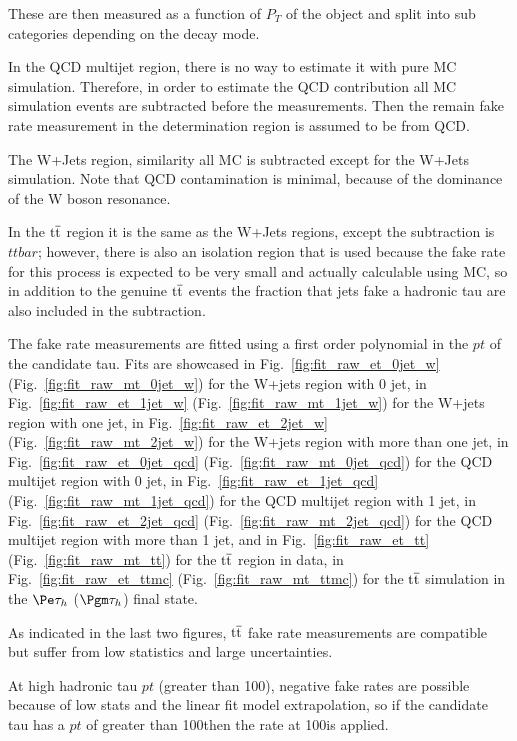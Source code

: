 These are then measured as a function of $P_T$ of the object and split into sub categories depending on the decay mode.  

In the QCD multijet region, there is no way to estimate it with pure MC simulation. Therefore, in order to estimate the QCD contribution all MC simulation events are subtracted before the measurements. Then the remain fake rate measurement in the determination region is assumed to be from QCD.

The W+Jets region, similarity all MC is subtracted except for the W+Jets simulation. Note that QCD contamination is minimal, because of the dominance of the W boson resonance. 

In the $\mathrm{t}\overline{\mathrm{t}}$ region it is the same as the W+Jets regions, except the subtraction is $ttbar$; however, there is also an isolation region that is used because the fake rate for this process is expected to be very small and actually calculable using MC, so in addition to the genuine $\mathrm{t}\overline{\mathrm{t}}$ events the fraction that jets fake a hadronic tau are also included in the subtraction. 


The fake rate measurements are fitted using a first order polynomial in the $pt$ of the candidate tau. Fits are showcased in Fig.~\ref{fig:fit_raw_et_0jet_w} (Fig.~\ref{fig:fit_raw_mt_0jet_w}) for the W+jets region with 0 jet, 
in Fig.~\ref{fig:fit_raw_et_1jet_w} (Fig.~\ref{fig:fit_raw_mt_1jet_w}) for the W+jets region with  
one jet, in Fig.~\ref{fig:fit_raw_et_2jet_w} (Fig.~\ref{fig:fit_raw_mt_2jet_w}) for the W+jets region with         
more than one jet, in Fig.~\ref{fig:fit_raw_et_0jet_qcd} (Fig.~\ref{fig:fit_raw_mt_0jet_qcd}) 
for the QCD multijet region with 0 jet, in Fig.~\ref{fig:fit_raw_et_1jet_qcd} (Fig.~\ref{fig:fit_raw_mt_1jet_qcd}) 
for the QCD multijet region with 1 jet, 
in Fig.~\ref{fig:fit_raw_et_2jet_qcd} (Fig.~\ref{fig:fit_raw_mt_2jet_qcd})
for the QCD multijet region with more than 1 jet,
and in Fig.~\ref{fig:fit_raw_et_tt} (Fig.~\ref{fig:fit_raw_mt_tt}) 
for the $\mathrm{t}\overline{\mathrm{t}}$ region in data, in Fig.~\ref{fig:fit_raw_et_ttmc} (Fig.~\ref{fig:fit_raw_mt_ttmc}) 
for the $\mathrm{t}\overline{\mathrm{t}}$ simulation in the $\Pe\tauh$ ($\Pgm\tauh$) final state. 

As indicated in the last two figures, $\mathrm{t}\overline{\mathrm{t}}$ fake rate measurements are compatible but suffer from low statistics and large uncertainties.  


At high hadronic tau $pt$ (greater than 100\GeV), negative fake rates are possible because of low stats and the linear fit model extrapolation, so if the candidate tau has a $pt$ of greater than 100\GeV then the rate at 100\GeV is applied. 

